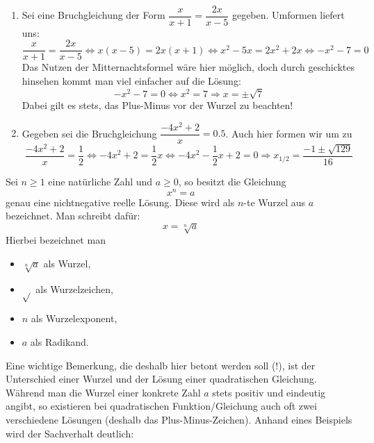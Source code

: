\documentclass[ngerman, 12pt]{nssheetxea}
\begin{document}
\begin{example} \
\begin{enumerate}[1.]

\item Sei eine Bruchgleichung der Form $\dfrac{x}{x+1} = \dfrac{2x}{x-5}$ gegeben. Umformen liefert uns:
\[ \dfrac{x}{x+1} = \dfrac{2x}{x-5} \Leftrightarrow x(x-5) = 2x(x+1) \Leftrightarrow x^2-5x = 2x^2+2x \Leftrightarrow -x^2 -7 = 0  \]
Das Nutzen der Mitternachtsformel wäre hier möglich, doch durch geschicktes hinsehen kommt man viel einfacher auf die Lösung:
\[ -x^2-7=0 \Leftrightarrow x^2 = 7 \Rightarrow x=\pm \sqrt{7} \]
Dabei gilt es stets, das Plus-Minus vor der Wurzel zu beachten!

\item Gegeben sei die Bruchgleichung $\dfrac{-4x^2+2}{x}=\num{0,5}$. Auch hier formen wir um zu
\[ \dfrac{-4x^2+2}{x} = \dfrac{1}{2} \Leftrightarrow -4x^2+2 = \dfrac{1}{2} x \Leftrightarrow -4x^2-\dfrac{1}{2} x + 2 = 0 \Rightarrow x_{1/2}=\dfrac{-1\pm \sqrt{129}}{16} \]

\end{enumerate}

\end{example}

\begin{definition}
Sei $n\geq 1$ eine natürliche Zahl und $a\geq 0$, so besitzt die Gleichung
\[ x^n=a\]
genau eine nichtnegative reelle Lösung. Diese wird als $n$-te Wurzel aus $a$ bezeichnet. Man schreibt dafür:
\[ x = \sqrt[n]{a}\]
Hierbei bezeichnet man
\begin{itemize}
\item $\sqrt[n]{a}$ als Wurzel,
\item $\sqrt{}$ als Wurzelzeichen,
\item $n$ als Wurzelexponent,
\item $a$ als Radikand. 
\end{itemize}
\end{definition}
Eine wichtige Bemerkung, die deshalb hier betont werden soll (!), ist der Unterschied einer Wurzel und der Lösung einer quadratischen Gleichung. Während man die Wurzel einer konkrete Zahl $a$ stets positiv und eindeutig angibt, so existieren bei quadratischen Funktion/Gleichung auch oft zwei verschiedene Lösungen (deshalb das Plus-Minus-Zeichen). Anhand eines Beispiels wird der Sachverhalt deutlich:
\end{document}
